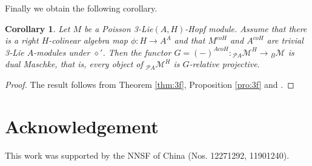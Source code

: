 \documentclass[11pt]{article}
\newtheorem{corollary}[theorem]{Corollary}
\def\di{\diamond}
\begin{document}
Finally we obtain the following corollary.
\begin{corollary}
Let $M$ be a Poisson 3-Lie$(A, H)$-Hopf module. Assume that there is a right $H$-colinear algebra map $\phi: H \rightarrow A^A$ and that $M^{coH}$ and $A^{coH}$ are trivial 3-Lie $A$-modules under $\di'$.
Then the functor $G=(-)^{AcoH}:\!  _{\mathcal{P}A}\mathcal{M}^H\rightarrow {}_{B}\mathcal{M}$ is dual Maschke, that is, every object of $ _{\mathcal{P}A}\mathcal{M}^H$ is $G$-relative projective.
\end{corollary}

\begin{proof}
The result follows from Theorem \ref{thm:3f}, Proposition \ref{pro:3f} and \cite[Theorem 3.4]{CM03}.
\end{proof}

\section*{Acknowledgement}

This work was supported by the NNSF of China (Nos. 12271292, 11901240).
\end{document}
